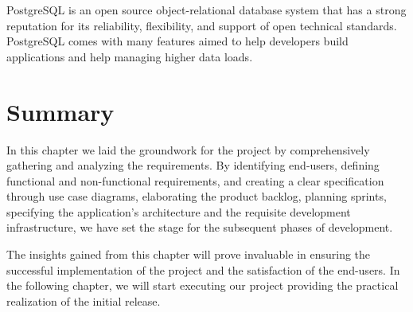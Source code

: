 \noindent PostgreSQL is an open source object-relational database system that has a strong reputation for its
reliability, flexibility, and support of open technical standards. PostgreSQL comes with many features
aimed to help developers build applications and help managing higher data loads.

\section*{Summary}
In this chapter we laid the groundwork for the project by comprehensively gathering and analyzing
the requirements. By identifying end-users, defining functional and non-functional requirements,
and creating a clear specification through use case diagrams, elaborating the product backlog, planning
sprints, specifying the application's architecture and the requisite development infrastructure, we have
set the stage for the subsequent phases of development.

The insights gained from this chapter will prove invaluable in ensuring the successful implementation
of the project and the satisfaction of the end-users. In the following chapter, we will start executing
our project providing the practical realization of the initial release.
